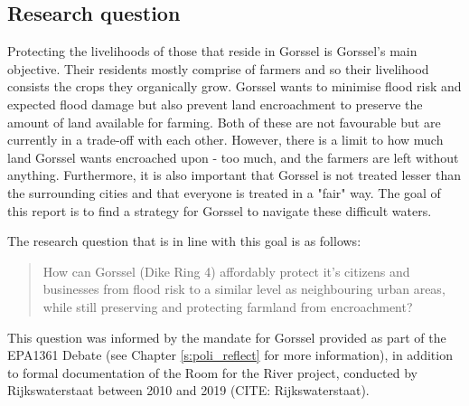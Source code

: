 


\subsection{Research question}

Protecting the livelihoods of those that reside in Gorssel is Gorssel's main objective. Their residents mostly comprise of farmers and so their livelihood consists the crops they organically grow. Gorssel wants to minimise flood risk and expected flood damage but also prevent land encroachment to preserve the amount of land available for farming. Both of these are not favourable but are currently in a trade-off with each other. However, there is a limit to how much land Gorssel wants encroached upon - too much, and the farmers are left without anything. Furthermore, it is also important that Gorssel is not treated lesser than the surrounding cities and that everyone is treated in a "fair" way. 
The goal of this report is to find a strategy for Gorssel to navigate these difficult waters. 


The research question that is in line with this goal is as follows: 
\begin{quote}
    How can Gorssel (Dike Ring 4) affordably protect it's citizens and businesses from flood risk to a similar level as neighbouring urban areas, while still preserving and protecting farmland from encroachment?
\end{quote}

This question was informed by the mandate for Gorssel provided as part of the EPA1361 Debate (see Chapter \ref{s:poli_reflect} for more information), in addition to formal documentation of the Room for the River project, conducted by Rijkswaterstaat between 2010 and 2019 (CITE: Rijkswaterstaat).

